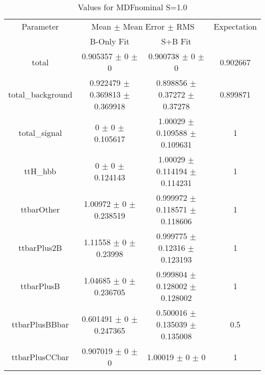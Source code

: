 \begin{table}
\centering
\caption{Values for MDFnominal S=1.0}
\begin{tabular}{cccc}
\toprule
Parameter & \multicolumn{2}{c}{Mean $\pm$ Mean Error $\pm$ RMS} & Expectation\\
 & B-Only Fit & S+B Fit & \\
\midrule
total & \num{0.905357} $\pm$ \num{0} $\pm$ \num{0} & \num{0.900738} $\pm$ \num{0} $\pm$ \num{0} & \num{0.902667}\\
total\_background & \num{0.922479} $\pm$ \num{0.369813} $\pm$ \num{0.369918} & \num{0.898856} $\pm$ \num{0.37272} $\pm$ \num{0.37278} & \num{0.899871}\\
total\_signal & \num{0} $\pm$ \num{0} $\pm$ \num{0.105617} & \num{1.00029} $\pm$ \num{0.109588} $\pm$ \num{0.109631} & \num{1}\\
ttH\_hbb & \num{0} $\pm$ \num{0} $\pm$ \num{0.124143} & \num{1.00029} $\pm$ \num{0.114194} $\pm$ \num{0.114231} & \num{1}\\
ttbarOther & \num{1.00972} $\pm$ \num{0} $\pm$ \num{0.238519} & \num{0.999972} $\pm$ \num{0.118571} $\pm$ \num{0.118606} & \num{1}\\
ttbarPlus2B & \num{1.11558} $\pm$ \num{0} $\pm$ \num{0.23998} & \num{0.999775} $\pm$ \num{0.12316} $\pm$ \num{0.123193} & \num{1}\\
ttbarPlusB & \num{1.04685} $\pm$ \num{0} $\pm$ \num{0.236705} & \num{0.999804} $\pm$ \num{0.128002} $\pm$ \num{0.128002} & \num{1}\\
ttbarPlusBBbar & \num{0.601491} $\pm$ \num{0} $\pm$ \num{0.247365} & \num{0.500016} $\pm$ \num{0.135039} $\pm$ \num{0.135008} & \num{0.5}\\
ttbarPlusCCbar & \num{0.907019} $\pm$ \num{0} $\pm$ \num{0} & \num{1.00019} $\pm$ \num{0} $\pm$ \num{0} & \num{1}\\
\bottomrule
\end{tabular}
\end{table}